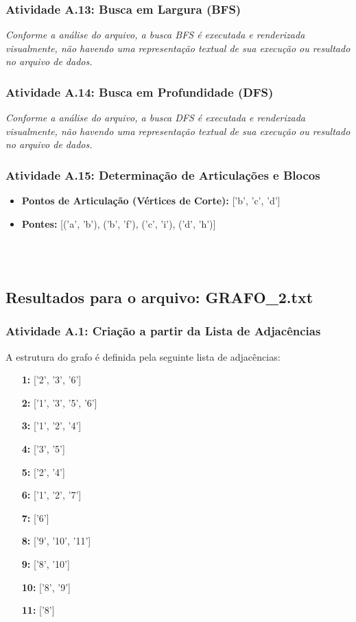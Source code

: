 \documentclass[a4paper,12pt]{article}
\begin{document}
\subsubsection*{Atividade A.13: Busca em Largura (BFS)}
\textit{Conforme a análise do arquivo, a busca BFS é executada e renderizada visualmente, não havendo uma representação textual de sua execução ou resultado no arquivo de dados.}

\subsubsection*{Atividade A.14: Busca em Profundidade (DFS)}
\textit{Conforme a análise do arquivo, a busca DFS é executada e renderizada visualmente, não havendo uma representação textual de sua execução ou resultado no arquivo de dados.}

\subsubsection*{Atividade A.15: Determinação de Articulações e Blocos}
\begin{itemize}[nosep, leftmargin=*]
    \item \textbf{Pontos de Articulação (Vértices de Corte):} ['b', 'c', 'd']
    \item \textbf{Pontes:} [('a', 'b'), ('b', 'f'), ('c', 'i'), ('d', 'h')]
\end{itemize}

\\ \\

\subsection{Resultados para o arquivo: GRAFO\_2.txt}

\subsubsection*{Atividade A.1: Criação a partir da Lista de Adjacências}
A estrutura do grafo é definida pela seguinte lista de adjacências:
\begin{itemize}[leftmargin=*]
    \item[\textbf{1:}] ['2', '3', '6']
    \item[\textbf{2:}] ['1', '3', '5', '6']
    \item[\textbf{3:}] ['1', '2', '4']
    \item[\textbf{4:}] ['3', '5']
    \item[\textbf{5:}] ['2', '4']
    \item[\textbf{6:}] ['1', '2', '7']
    \item[\textbf{7:}] ['6']
    \item[\textbf{8:}] ['9', '10', '11']
    \item[\textbf{9:}] ['8', '10']
    \item[\textbf{10:}] ['8', '9']
    \item[\textbf{11:}] ['8']
\end{itemize}
\end{document}
